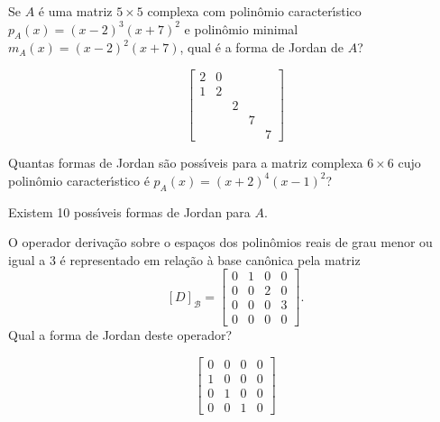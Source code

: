 \documentclass[12pt]{exam}
\begin{document}
\begin{exercicio}
  Se $A$ \'e uma matriz $5 \times 5$ complexa com polin\^omio caracter{\'\i}stico $p_A(x) = (x - 2)^3(x + 7)^2$ e polin\^omio minimal $m_A(x) = (x - 2)^2(x + 7)$, qual \'e a forma de Jordan de $A$?
  \begin{solucao}
    \[
      \begin{bmatrix}
        2 & 0\\
        1 & 2\\
        & & 2\\
        & & & 7\\
        & & & & 7
      \end{bmatrix}
    \]
  \end{solucao}
\end{exercicio}

\begin{exercicio}
  Quantas formas de Jordan s\~ao poss{\'\i}veis para a matriz complexa $6 \times 6$ cujo polin\^omio caracter{\'\i}stico \'e $p_A(x) = (x + 2)^4(x - 1)^2$?
  \begin{solucao}
    Existem 10 poss{\'\i}veis formas de Jordan para $A$.
  \end{solucao}
\end{exercicio}

\begin{exercicio}
  O operador deriva\c{c}\~ao sobre o espa\c{c}os dos polin\^omios reais de grau menor ou igual a 3 \'e representado em rela\c{c}\~ao \`a base can\^onica pela matriz
  \[
      [D]_\mathcal{B} = \begin{bmatrix}
        0 & 1 & 0 & 0\\
        0 & 0 & 2 & 0\\
        0 & 0 & 0 & 3\\
        0 & 0 & 0 & 0
      \end{bmatrix}.
  \]
  Qual a forma de Jordan deste operador?
  \begin{solucao}
    \[
      \begin{bmatrix}
        0 & 0 & 0 & 0\\
        1 & 0 & 0 & 0\\
        0 & 1 & 0 & 0\\
        0 & 0 & 1 & 0
      \end{bmatrix}
    \]
  \end{solucao}
\end{exercicio}
\end{document}
